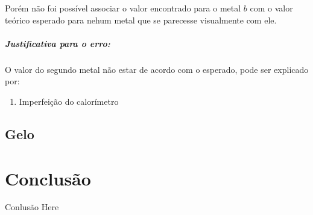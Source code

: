 \documentclass[a4paper]{article}
\begin{document}
				Porém não foi possível associar o valor encontrado para o metal $b$
				com o valor teórico esperado para nehum metal que se parecesse visualmente
				com ele. 


				\subparagraph{Justificativa para o erro:}

				O valor do segundo metal não estar de acordo com o esperado, pode
				ser explicado por:
				\begin{enumerate}
					\item Imperfeição do calorímetro
				\end{enumerate}

		\subsection{Gelo}


	\section{Conclusão}

		Conlusão Here 
\end{document}
